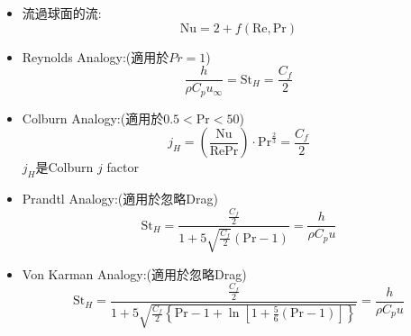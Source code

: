 \documentclass[../main.tex]{subfiles}
\begin{document}
\begin{itemize}
\begin{itemize}
        \begin{equation}
          \text{Nu} = 8 + f(\text{Re},\text{Pr},\frac{L}{D})
        \end{equation}
      \item 流過球面的流:
        \begin{equation}
          \text{Nu} = 2 + f(\text{Re},\text{Pr})
        \end{equation}
      \item Reynolds Analogy:(適用於$Pr=1$)
        \begin{equation}
          \frac{h}{\rho C_p u_\infty} = \text{St}_H = \frac{C_f}{2}
        \end{equation}
      \item Colburn Analogy:(適用於$0.5<\text{Pr}<50$)
        \begin{equation}
          j_H = \left(\frac{\text{Nu}}{\text{Re}\text{Pr}}\right)\cdot \text{Pr}^{\frac{2}{3}} = \frac{C_f}{2}
        \end{equation}
        $j_H$是Colburn $j$ factor
      \item Prandtl Analogy:(適用於忽略Drag)
        \begin{equation}
          \text{St}_H = \frac{\frac{C_f}{2}}{1+5\sqrt{\frac{C_f}{2}}\left(\text{Pr}-1\right)} = \frac{h}{\rho C_p u}
        \end{equation}
      \item Von Karman Analogy:(適用於忽略Drag)
        \begin{equation}
          \text{St}_H = \frac{\frac{C_f}{2}}{1+5\sqrt{\frac{C_f}{2}\left\{
            \text{Pr}-1+\ln\left[1+\frac{5}{6}\left(\text{Pr}-1\right)\right]
          \right\}}} = \frac{h}{\rho C_p u}
        \end{equation}
  \end{itemize}
\end{itemize}
\end{document}
